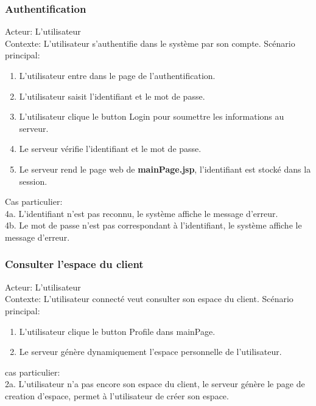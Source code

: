 \documentclass[14px]{article}
\begin{document}
\subsubsection{Authentification}
Acteur: L'utilisateur\\
Contexte: L'utilisateur s'authentifie dans le système par son compte.
Scénario principal:
\begin{enumerate}
	\item L'utilisateur entre dans le page de l'authentification.
	\item L'utilisateur saisit l'identifiant et le mot de passe.
	\item L'utilisateur clique le button Login pour soumettre les informations au serveur.
	\item Le serveur vérifie l'identifiant et le mot de passe.
	\item Le serveur rend le page web de \textbf{mainPage.jsp}, l'identifiant est stocké dans la session.
\end{enumerate}
Cas particulier: \\
4a. L'identifiant n'est pas reconnu, le système affiche le message d'erreur.\\
4b. Le mot de passe n'est pas correspondant à l'identifiant, le système affiche le message d'erreur.

\subsubsection{Consulter l'espace du client}
Acteur: L'utilisateur\\
Contexte: L'utilisateur connecté veut consulter son espace du client.
Scénario principal:
\begin{enumerate}
	\item L'utilisateur clique le button Profile dans mainPage.
	\item Le serveur génère dynamiquement l'espace personnelle de l'utilisateur.   
\end{enumerate}
cas particulier:\\
2a. L'utilisateur n'a pas encore son espace du client, le serveur génère le page de creation d'espace, permet à l'utilisateur de créer son espace.
\end{document}
